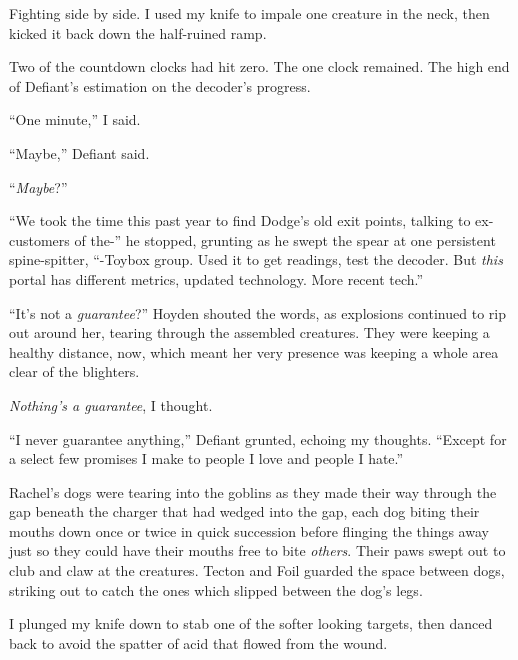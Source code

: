 Fighting side by side.  I used my knife to impale one creature in the neck, then kicked it back down the half-ruined ramp.



Two of the countdown clocks had hit zero.  The one clock remained.  The high end of Defiant's estimation on the decoder's progress.



``One minute,'' I said.



``Maybe,'' Defiant said.



``\emph{Maybe}?''



``We took the time this past year to find Dodge's old exit points, talking to ex-customers of the-'' he stopped, grunting as he swept the spear at one persistent spine-spitter, ``-Toybox group.  Used it to get readings, test the decoder.  But \emph{this} portal has different metrics, updated technology.  More recent tech.''



``It's not a \emph{guarantee}?''  Hoyden shouted the words, as explosions continued to rip out around her, tearing through the assembled creatures.  They were keeping a healthy distance, now, which meant her very presence was keeping a whole area clear of the blighters.



\emph{Nothing's a guarantee}, I thought.



``I never guarantee anything,'' Defiant grunted, echoing my thoughts.  ``Except for a select few promises I make to people I love and people I hate.''



Rachel's dogs were tearing into the goblins as they made their way through the gap beneath the charger that had wedged into the gap, each dog biting their mouths down once or twice in quick succession before flinging the things away just so they could have their mouths free to bite \emph{others}.  Their paws swept out to club and claw at the creatures.  Tecton and Foil guarded the space between dogs, striking out to catch the ones which slipped between the dog's legs.



I plunged my knife down to stab one of the softer looking targets, then danced back to avoid the spatter of acid that flowed from the wound.



